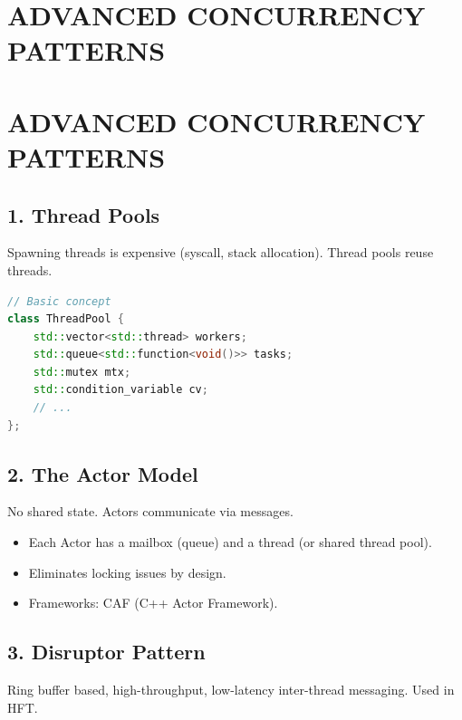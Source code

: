 \hypertarget{advanced-concurrency-patterns}{%
\chapter{ADVANCED CONCURRENCY
PATTERNS}\label{advanced-concurrency-patterns}}

\hypertarget{advanced-concurrency-patterns-1}{%
\chapter{ADVANCED CONCURRENCY
PATTERNS}\label{advanced-concurrency-patterns-1}}

\hypertarget{thread-pools}{%
\section{1. Thread Pools}\label{thread-pools}}

Spawning threads is expensive (syscall, stack allocation). Thread pools
reuse threads.

\begin{lstlisting}[language={C++}]
// Basic concept
class ThreadPool {
    std::vector<std::thread> workers;
    std::queue<std::function<void()>> tasks;
    std::mutex mtx;
    std::condition_variable cv;
    // ...
};
\end{lstlisting}

\hypertarget{the-actor-model}{%
\section{2. The Actor Model}\label{the-actor-model}}

No shared state. Actors communicate via messages.

\begin{itemize}
\tightlist
\item
  Each Actor has a mailbox (queue) and a thread (or shared thread pool).
\item
  Eliminates locking issues by design.
\item
  Frameworks: CAF (C++ Actor Framework).
\end{itemize}

\hypertarget{disruptor-pattern}{%
\section{3. Disruptor Pattern}\label{disruptor-pattern}}

Ring buffer based, high-throughput, low-latency inter-thread messaging.
Used in HFT.

